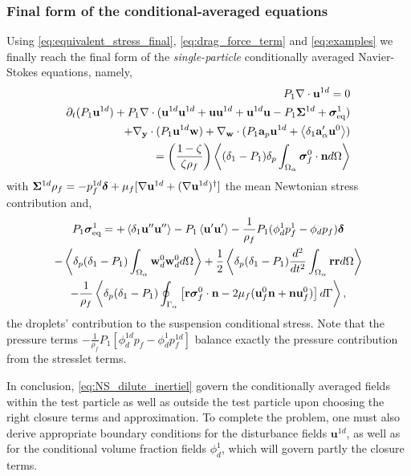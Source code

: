 \subsubsection{Final form of the conditional-averaged equations}

Using  \ref{eq:equivalent_stress_final}, \ref{eq:drag_force_term} and \ref{eq:examples} we finally reach the final form of the \textit{single-particle}  conditionally averaged Navier-Stokes equations, namely, 
\begin{align}
    P_1 \div \textbf{u}^{1d} = 0 \\
    \pddt (P_1 \textbf{u}^{1d})
    + P_1 \div (
     \textbf{u}^{1d} \textbf{u}^{1d}  
    + \textbf{u} \textbf{u}^{1d} 
    + \textbf{u}^{1d} \textbf{u} 
    - P_1 \bm\Sigma^{1d}
    + \bm\sigma^1_\text{eq})\nonumber\\
    + \pddy\cdot (P_1 \textbf{u}^{1d} \textbf{w}) 
    + \pddw\cdot(P_1 \textbf{a}_p \textbf{u}^{1d} + \avg{\delta_1 \textbf{a}_\alpha' \textbf{u}^0} )\\
    = \left(\frac{1-\zeta}{\zeta\rho_f}\right) \avg{ (\delta_1 - P_1) \delta_p \intO{\bm\sigma_f^0\cdot \textbf{n}}}
    \label{eq:NS_dilute_inertiel}
\end{align}
with $\bm\Sigma^{1d} \rho_f  = -p_f^{1d} \bm\delta + \mu_f [\mathbf{\nabla} \textbf{u}^{1d}+(\mathbf{\nabla} \textbf{u}^{1d})^\dagger]$ the mean Newtonian stress contribution and, 
\begin{multline*}
    P_1\bm\sigma^1_\text{eq}
    = + \left<\delta_1 \textbf{u}''\textbf{u}''\right>
    - P_1 \left< \textbf{u}'\textbf{u}'\right>
    - \frac{1}{\rho_f }P_1 (\phi_d^1 p_f^1 - \phi_d p_f)\bm\delta \\
    -  \left<\delta_p (\delta_1 - P_1) \int_{\Omega_{\alpha}} \textbf{w}_d^0\textbf{w}_d^0  d\Omega\right>
    +  \frac{1}{2}\left<\delta_p (\delta_1 - P_1)\frac{d^2}{dt^2} \int_{\Omega_{\alpha}} \textbf{rr} d\Omega \right> \\
    - \frac{1}{\rho_f}\left<\delta_p (\delta_1 - P_1) \oint_{\Gamma_{\alpha}} \left[
        \textbf{r}\bm{\sigma}_f^0 \cdot \textbf{n}
        -  2 \mu_f (\textbf{u}_f^0 \textbf{n} + \textbf{n} \textbf{u}_f^0)
        \right] 
     d\Gamma\right>,
\end{multline*}
the droplets' contribution to the suspension conditional stress. 
Note that the pressure terms $- \frac{1}{\rho_f }P_1 [\phi_d^{1d} p_f - \phi_d^1 p_f^{1d}]$ balance exactly the pressure contribution from the stresslet terms. 


In conclusion, \ref{eq:NS_dilute_inertiel} govern the conditionally averaged fields within the test particle as well as outside the test particle upon choosing the right closure terms and approximation. 
To complete the problem, one must also derive appropriate boundary conditions for the disturbance fields $\textbf{u}^{1d}$, as well as for the conditional volume fraction fields $\phi_d^1$, which will govern partly the closure terms. 

